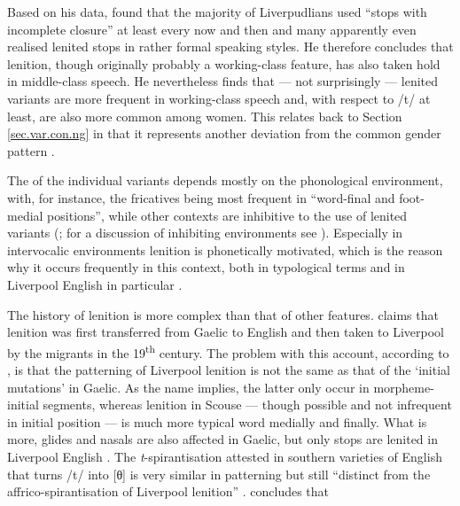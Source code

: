 Based on his \citeyear{knowles1973} data, \citeauthor{knowles1973} found that the majority of Liverpudlians used ``stops with incomplete closure'' at least every now and then and many apparently even realised lenited stops in rather formal speaking styles.
He therefore concludes that lenition, though originally probably a working-class feature, has also taken hold in middle-class speech.
He nevertheless finds that --- not surprisingly --- lenited variants are more frequent in working-class speech and, with respect to /t/ at least, are also more common among women.
This relates back to Section \ref{sec.var.con.ng} in that it represents another deviation from the common gender pattern \citeyearpar[cf.][325--327]{knowles1973}.

The  of the individual variants depends mostly on the phonological environment, with, for instance, the fricatives being most frequent in ``word-final and foot-medial positions'', while other contexts are inhibitive to the use of lenited variants (\citealp[cf.][130]{honeybone2007}; for a discussion of inhibiting environments see \citealt{honeybone2001}).
Especially in intervocalic environments lenition is phonetically motivated, which is the reason why it occurs frequently in this context, both in typological terms and in Liverpool English in particular \parencite[cf.][230 and 243]{honeybone2001}.

The history of lenition is more complex than that of other features.
\textcite{hickey1996} claims that lenition was first transferred from  Gaelic to  English and then taken to Liverpool by the  migrants in the 19\textsuperscript{th} century.
The problem with this account, according to \citet{honeybone2007}, is that the patterning of Liverpool lenition is not the same as that of the `initial mutations' in  Gaelic.
As the name implies, the latter only occur in morpheme-initial segments, whereas lenition in Scouse --- though possible and not infrequent in initial position --- is much more typical word medially and finally.
What is more, glides and nasals are also affected in Gaelic, but only stops are lenited in Liverpool English \citep[cf.][131]{honeybone2007}.
The \emph{t}-spirantisation attested in southern varieties of  English that turns /t/ into [θ] is very similar in patterning but still ``distinct from the affrico-spirantisation of Liverpool lenition'' \citep[132]{honeybone2007}.
\citeauthor{honeybone2007} concludes that

